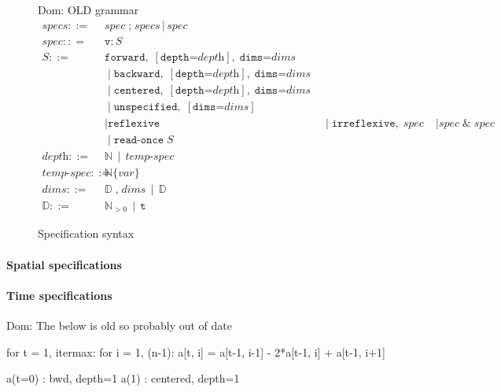 \documentclass[9pt]{sigplanconf}
\newcommand{\dnote}[1]{\textcolor{darkpurple}{Dom: #1}}
\theoremstyle{definition}
\begin{document}
\begin{figure}
\dnote{OLD grammar}
\begin{align*}
\textit{specs} ::= & \; \textit{spec} \; \texttt{;} \; \textit{specs} \, \mid \, \textit{spec} \\
%
\textit{spec} :: = & \; \texttt{v} : S \\[0.5em]
S ::= &  \; \texttt{forward}, \; [\texttt{depth=}\textit{depth}], \; \texttt{dims=}\textit{dims} \\
& \; \mid \texttt{backward}, \; [\texttt{depth=}\textit{depth}], \; \texttt{dims=}\textit{dims} \\
& \; \mid \texttt{centered}, \; [\texttt{depth=}\textit{depth}], \; \texttt{dims=}\textit{dims} \\
& \; \mid \texttt{unspecified}, \; [\texttt{dims=}\textit{dims}] \\
& \; \mid \texttt{reflexive}\, \; 
& \; \mid \texttt{irreflexive}, \; \textit{spec}
& \; \mid \textit{spec} \; \texttt{\&} \; \textit{spec} \\
& \; \mid \texttt{read-once} \; S \\[0.5em]
\textit{depth} ::= & \; \mathbb{N} \, \mid \, \textit{temp-spec} \\ 
\textit{temp-spec} ::= & \; \mathbb{N}\{var\} \\
\textit{dims} ::= & \; \mathbb{D} \; \texttt{,} \; \textit{dims} \, \mid
                    \, \mathbb{D} \\
\mathbb{D}  ::= & \; \mathbb{N}_{>0} \, \mid \, \texttt{t}
\end{align*}
\caption{Specification syntax}
\label{fig:syntax}
\end{figure}

\paragraph{Spatial specifications}

\paragraph{Time specifications}
\dnote{The below is old so probably out of date}

\begin{ExmVerbatim}
for t = 1, itermax:
   for i = 1, (n-1):
      a[t, i] = a[t-1, i-1] - 2*a[t-1, i] + a[t-1, i+1]
\end{ExmVerbatim}

\begin{SpecVerbatim}
a(t=0) : bwd, depth=1
a(1)   : centered, depth=1
\end{SpecVerbatim}
\end{document}
